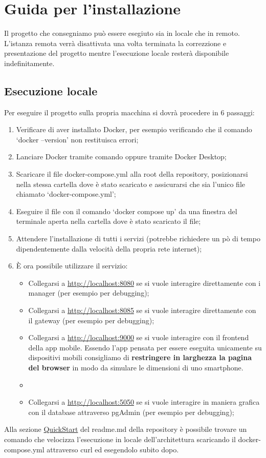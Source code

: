 \section{Guida per l'installazione}
Il progetto che consegniamo può essere esegiuto sia in locale che in remoto. L'istanza remota verrà disattivata una volta terminata la correzzione e presentazione del progetto mentre l'esecuzione locale resterà disponibile indefinitamente.
\subsection{Esecuzione locale}
Per eseguire il progetto sulla propria macchina si dovrà procedere in 6 passaggi:
\begin{enumerate}
  \item Verificare di aver installato Docker, per esempio verificando che il comando `docker --version' non restituisca errori;
  \item Lanciare Docker tramite comando oppure tramite Docker Desktop;
  \item Scaricare il file docker-compose.yml alla root della repository, posizionarsi nella stessa cartella dove è stato scaricato e assicurarsi che sia l'unico file chiamato `docker-compose.yml';
  \item Eseguire il file con il comando `docker compose up' da una finestra del terminale aperta nella cartella dove è stato scaricato il file;
  \item Attendere l'installazione di tutti i servizi (potrebbe richiedere un pò di tempo dipendentemente dalla velocità della propria rete internet);
  \item È ora possibile utilizzare il servizio:
  \begin{itemize}
    \item Collegarsi a \href{http://localhost:8080}{http://localhost:8080} se si vuole interagire direttamente con i manager (per esempio per debugging);
    \item Collegarsi a \href{http://localhost:8085}{http://localhost:8085} se si vuole interagire direttamente con il gateway (per esempio per debugging);
    \item Collegarsi a \href{http://localhost:9000}{http://localhost:9000} se si vuole interagire con il frontend della app mobile. Essendo l'app pensata per essere eseguita unicamente su dispositivi mobili consigliamo di \textbf{restringere in larghezza la pagina del browser} in modo da simulare le dimensioni di uno smartphone.
    \item     
    \item Collegarsi a \href{http://localhost:5050}{http://localhost:5050} se si vuole interagire in maniera grafica con il database attraverso pgAdmin (per esempio per debugging);
  \end{itemize}
\end{enumerate}
Alla sezione \href{https://github.com/FI-153/Progetto-PAC-2023-24/blob/main/README.md#quickstart}{QuickStart} del readme.md della repository è possibile trovare un comando che velocizza l'esecuzione in locale dell'architettura scaricando il docker-compose.yml attraverso curl ed esegendolo subito dopo.
